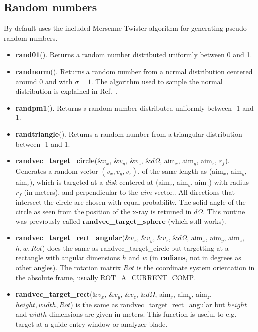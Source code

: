\subsection{Random numbers}
By default  \MCX uses the included Mersenne Twister\cite{} algorithm for generating pseudo random numbers.
\begin{itemize}
\item {\bfseries rand01}(). Returns a random number distributed uniformly between 0 and 1.
\item {\bfseries randnorm}(). Returns a random number from a normal
  distribution centered around 0 and with $\sigma=1$. The algorithm used to
  sample the normal distribution is explained in Ref.~\cite[ch.7]{num_rep}.
\item {\bfseries randpm1}(). Returns a random number distributed uniformly between -1 and 1.
\item {\bfseries randtriangle}(). Returns a random number from a triangular distribution between -1 and 1.
\item {\bfseries randvec\_target\_circle}(\&$v_x$, \&$v_y$, \&$v_z$, \&$d\Omega$,
  aim$_x$, aim$_y$, aim$_z$, $r_f$). Generates a random vector $(v_x, v_y,
  v_z)$, of the same length as (aim$_x$, aim$_y$, aim$_z$), which is
  targeted at a \emph{disk} centered at (aim$_x$, aim$_y$, aim$_z$) with
  radius $r_f$ (in meters), and perpendicular to the \emph{aim} vector.. All directions
  that intersect the circle are chosen with equal probability. The solid
  angle of the circle as seen from the position of the x-ray is returned
  in $d\Omega$. This routine was previously called {\bfseries randvec\_target\_sphere}
  (which still works).
\item {\bfseries randvec\_target\_rect\_angular}(\&$v_x$, \&$v_y$, \&$v_z$,
  \&$d\Omega$, aim$_x$, aim$_y$, aim$_z$,$h, w, Rot$) does the same as
  randvec\_target\_circle but targetting at a rectangle with angular dimensions
  $h$ and $w$ (in {\bfseries radians}, not in degrees as other angles). The
  rotation matrix $Rot$ is the coordinate system orientation in the absolute
  frame, usually ROT\_A\_CURRENT\_COMP.
\item {\bfseries randvec\_target\_rect}(\&$v_x$, \&$v_y$, \&$v_z$,
  \&$d\Omega$, aim$_x$, aim$_y$, aim$_z$,$height, width, Rot$) is the same as
  randvec\_target\_rect\_angular but $height$ and $width$ dimensions are given
  in meters. This function is useful to e.g. target at a guide entry window
  or analyzer blade.
\end{itemize}

